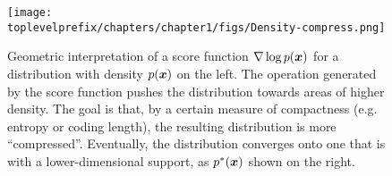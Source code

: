 \documentclass[../../book-main.tex]{subfiles}
\begin{document}
\begin{figure}
    \centering
    \texttt{[image: \\toplevelprefix/chapters/chapter1/figs/Density-compress.png]}
    \caption{Geometric interpretation of a score function $\nabla \log p(\bm{x})$ for a distribution with density $p(\bm{x})$ on the left. The operation generated by the score function pushes the distribution towards areas of higher density. The goal is that, by a certain measure of compactness (e.g. entropy or coding length), the resulting distribution is more ``compressed''. Eventually, the distribution converges onto one that is with a lower-dimensional support, as $p^*(\bm{x})$ shown on the right.}
    \label{fig:score-function}
\end{figure}
\end{document}
